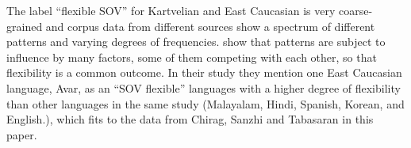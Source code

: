 \documentclass[output=paper,colorlinks,citecolor=brown,draftmode]{langscibook}
\begin{document}
The label ``flexible SOV'' for Kartvelian and East Caucasian is very coarse-grained and corpus data from different sources show a spectrum of different  patterns and varying degrees of frequencies. \citet{levshina_why_2023} show that  patterns are subject to influence by many factors, some of them competing with each other, so that  flexibility is a common outcome. In their study they mention one East Caucasian language, Avar, as an ``SOV flexible'' languages with a higher degree of flexibility than other languages in the same study (Malayalam, Hindi, Spanish, Korean, and English.), which fits to the data from Chirag, Sanzhi and Tabasaran in this paper. 






\end{document}
